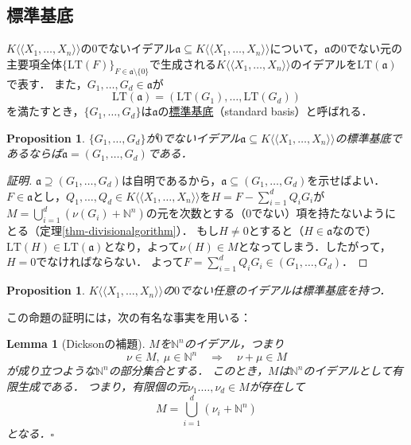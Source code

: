 \documentclass[a4paper,12pt, dvipdfmx]{jsbook}
\def\N{\mathbb{N}}
\def\dl{\langle\!\langle}
\def\dr{\rangle\!\rangle}
\def\LT{\mathrm{LT}}
\theoremstyle{plain}
\newtheorem{prop}[thm]{\bfseries Proposition}
\newtheorem{lem}[thm]{\bfseries Lemma}
\theoremstyle{definition}
\begin{document}
\subsection{標準基底}\label{sub-standardbases}
$K\dl X_1,\ldots,X_n\dr$の$0$でないイデアル$\mathfrak{a}\subseteq K\dl X_1,\ldots,X_n\dr$について，$\mathfrak{a}$の$0$でない元の主要項全体$\{\LT(F)\}_{F\in\mathfrak{a}\setminus\{0\}}$で生成される$K\dl X_1,\ldots,X_n\dr$のイデアルを$\LT(\mathfrak{a})$で表す．
また，$G_1,\ldots,G_d\in\mathfrak{a}$が
$$
\LT(\mathfrak{a})=(\LT(G_1),\ldots,\LT(G_d))
$$
を満たすとき，$\{G_1,\ldots,G_d\}$は$\mathfrak{a}$の\underline{標準基底}（standard basis）と呼ばれる．

\begin{prop}\label{prop-standardbasis1}{\rm 
$\{G_1,\ldots,G_d\}$が$0$でないイデアル$\mathfrak{a}\subseteq K\dl X_1,\ldots,X_n\dr$の標準基底であるならば$\mathfrak{a}=(G_1,\ldots,G_d)$である．}
\end{prop}

\begin{proof}[証明]
$\mathfrak{a}\supseteq(G_1,\ldots,G_d)$は自明であるから，$\mathfrak{a}\subseteq(G_1,\ldots,G_d)$を示せばよい．
$F\in\mathfrak{a}$とし，$Q_1,\ldots,Q_d\in K\dl X_1,\ldots,X_n\dr$を$H=F-\sum^d_{i=1}Q_iG_i$が$M=\bigcup^d_{i=1}(\nu(G_i)+\N^n)$の元を次数とする（$0$でない）項を持たないようにとる（定理\ref{thm-divisionalgorithm}）．
もし$H\neq 0$とすると（$H\in\mathfrak{a}$なので）$\LT(H)\in\LT(\mathfrak{a})$となり，よって$\nu(H)\in M$となってしまう．したがって，$H=0$でなければならない．
よって$F=\sum^d_{i=1}Q_iG_i\in(G_1,\ldots,G_d)$．
\end{proof}

\begin{prop}\label{prop-standardbasis2}{\rm 
$K\dl X_1,\ldots,X_n\dr$の$0$でない任意のイデアルは標準基底を持つ．}
\end{prop}

この命題の証明には，次の有名な事実を用いる：
\begin{lem}[Dicksonの補題]\label{lem-Dickson}{\rm 
$M$を$\N^n$のイデアル，つまり
$$
\nu\in M,\ \mu\in\N^n\quad\Longrightarrow\quad\nu+\mu\in M
$$
が成り立つような$\N^n$の部分集合とする．
このとき，$M$は$\N^n$のイデアルとして有限生成である．
つまり，有限個の元$\nu_1.\ldots,\nu_d\in M$が存在して
$$
M=\bigcup^d_{i=1}(\nu_i+\N^n)
$$
となる．}\hfill$\square$
\end{lem}
\end{document}
